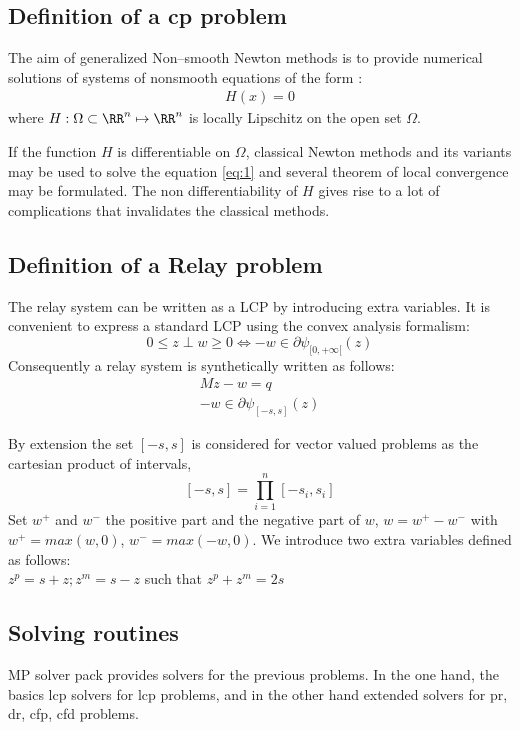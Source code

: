 \subsection{Definition of a \acs{cp} problem}
The aim of generalized Non--smooth Newton methods is to provide numerical solutions of systems of nonsmooth equations of the form :
\begin{eqnarray}
  \label{eq:1}
  H(x)=0
\end{eqnarray}
where $H:\Omega \subset \RR^n \mapsto \RR^n $ is locally Lipschitz on the open set $\Omega$. 

If the function $H$ is differentiable on $\Omega$, classical Newton  methods and its variants may be used to solve the equation \eqref{eq:1} and several theorem of local convergence may be formulated. The non differentiability of $H$ gives rise to a lot of complications that invalidates the classical methods.




\subsection{Definition of a Relay problem}
The relay system can be written as a LCP by introducing extra variables. It is convenient to express a standard LCP using the convex analysis formalism:
$$0\le z \perp w \ge 0 \iff -w \in \partial\psi_{[0,+\infty[}(z)$$
Consequently a relay system is synthetically written as follows:
\begin{eqnarray}
Mz-w=q\label{relequi}\\
-w \in \partial\psi_{[-s,s]}(z)\label{relcomp} 
\end{eqnarray}

By extension the set $[-s,s]$ is considered for vector valued problems as the cartesian product of intervals,\\
$$ [-s,s]=\prod_{i=1}^{n}[-s_{i},s_{i}]$$
Set $w^+$ and $w^-$ the positive part and the negative part of $w$, $w=w^+-w^-$ with $w^+=max(w,0)$, $w^-=max(-w,0)$. We introduce two extra variables defined as follows:\\
$z^{p}=s+z ; z^{m}=s-z $ such that $z^{p}+z^{m}=2s$\\


\subsection{Solving routines}
MP solver pack provides solvers for the previous problems. In the one hand, the basics \ac{lcp} solvers for \ac{lcp} problems, and in the other hand extended solvers for \ac{pr}, \ac{dr}, \ac{cfp}, \ac{cfd} problems.



